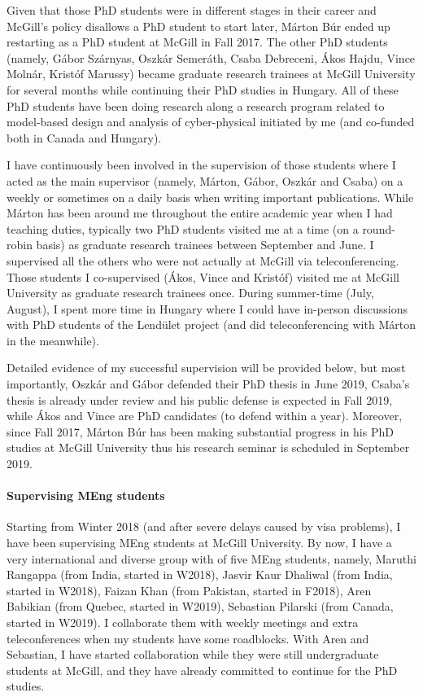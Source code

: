 Given that those PhD students were in different stages in their career and McGill's policy disallows a PhD student to start 
later, Márton Búr ended up restarting as a PhD student at McGill in Fall 2017. The other PhD students (namely, Gábor 
Szárnyas, Oszkár Semeráth, Csaba Debreceni, Ákos Hajdu, Vince Molnár, Kristóf Marussy) became graduate research 
trainees at McGill University for several months while continuing their PhD studies in Hungary. 
All of these PhD students have been doing research along a research program 
related to model-based design and analysis of cyber-physical initiated by me (and co-funded both in Canada and Hungary). 

I have continuously been involved in the supervision of those students where I acted as the main supervisor (namely, 
Márton, Gábor, Oszkár and Csaba) on a weekly or sometimes on a daily basis when writing important publications. While 
Márton has been around me throughout the entire academic year when I had teaching duties, typically two PhD students 
visited me at a time (on a round-robin basis) as graduate research trainees between September and June. I supervised all the others who were not actually at McGill via 
teleconferencing. Those students I co-supervised (Ákos, Vince and Kristóf) visited me at McGill University as graduate 
research trainees once. During summer-time (July, August), I spent more time in Hungary where I could have in-person 
discussions with PhD students of the Lendület project (and did teleconferencing with Márton in the meanwhile). 

Detailed evidence of my successful supervision will be provided below, but most importantly, Oszkár and Gábor defended 
their PhD thesis in June 2019, Csaba's thesis is already under review and his public defense is expected in Fall 2019, while 
Ákos and Vince are PhD candidates (to defend within a year). Moreover, since Fall 2017, Márton Búr has been making 
substantial progress in his PhD studies at McGill University thus his research seminar is scheduled in September 2019.


\paragraph{Supervising MEng students}
Starting from Winter 2018 (and after severe delays caused by visa problems), I have been supervising MEng students at McGill University. By now, I have a very international and diverse group with of five MEng students, namely, Maruthi Rangappa (from India, started in W2018), Jasvir Kaur Dhaliwal (from India, started in W2018), Faizan Khan (from Pakistan, started in F2018), Aren Babikian (from Quebec, started in W2019), Sebastian Pilarski (from Canada, started in W2019). I collaborate them with weekly meetings and extra teleconferences when my students have some roadblocks. With Aren and Sebastian, I have started collaboration while they were still undergraduate students at McGill, and they have already committed to continue for the PhD studies.  

